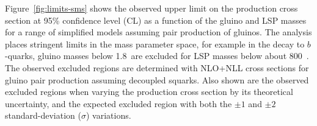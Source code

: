 Figure~\ref{fig:limits-sms} shows the observed upper limit on the
production cross section at 95\% confidence level (CL) as a function
of the gluino and LSP masses for
a range of simplified models assuming pair production of gluinos. The analysis places stringent limits in the mass parameter space, for example in the decay to $b$-quarks, gluino masses below 1.8~\TeV are excluded for LSP masses below about 800~\gev.
The observed excluded regions are determined with NLO+NLL
cross sections for gluino pair production assuming decoupled squarks. Also shown are the
observed excluded regions when varying the production cross section by
its theoretical uncertainty, and the expected excluded region with
both the ${\pm}1$ and ${\pm}2$ standard-deviation ($\sigma$)
variations. 

